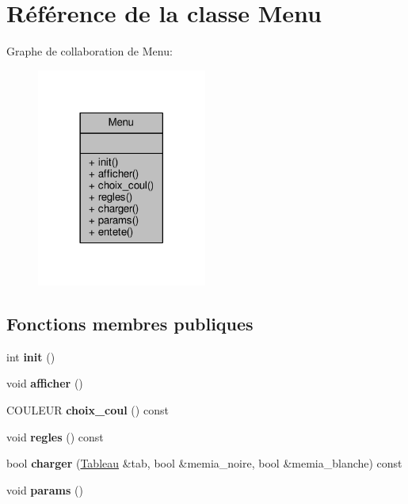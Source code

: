 \hypertarget{classMenu}{}\section{Référence de la classe Menu}
\label{classMenu}


Graphe de collaboration de Menu\+:\nopagebreak
\begin{figure}[H]
\begin{center}
\leavevmode
\includegraphics[width=158pt]{classMenu__coll__graph}
\end{center}
\end{figure}
\subsection*{Fonctions membres publiques}
\begin{DoxyCompactItemize}
\item 
int {\bfseries init} ()\hypertarget{classMenu_a514c26765dc9e00098f199c6c98788a4}{}\label{classMenu_a514c26765dc9e00098f199c6c98788a4}

\item 
void {\bfseries afficher} ()\hypertarget{classMenu_afc925fd19c50c3c724924f32673fbaf8}{}\label{classMenu_afc925fd19c50c3c724924f32673fbaf8}

\item 
C\+O\+U\+L\+E\+UR {\bfseries choix\+\_\+coul} () const \hypertarget{classMenu_a8985cbb2c3618edc7c4c42eb94ef9513}{}\label{classMenu_a8985cbb2c3618edc7c4c42eb94ef9513}

\item 
void {\bfseries regles} () const \hypertarget{classMenu_abca65b44c7a2f424a00c4381f853dee0}{}\label{classMenu_abca65b44c7a2f424a00c4381f853dee0}

\item 
bool {\bfseries charger} (\hyperlink{classTableau}{Tableau} \&tab, bool \&memia\+\_\+noire, bool \&memia\+\_\+blanche) const \hypertarget{classMenu_a4d938d0f79289ad48576d7a99db0461d}{}\label{classMenu_a4d938d0f79289ad48576d7a99db0461d}

\item 
void {\bfseries params} ()\hypertarget{classMenu_aceb88979ec505e8aba9924dc8206678c}{}\label{classMenu_aceb88979ec505e8aba9924dc8206678c}

\end{DoxyCompactItemize}
